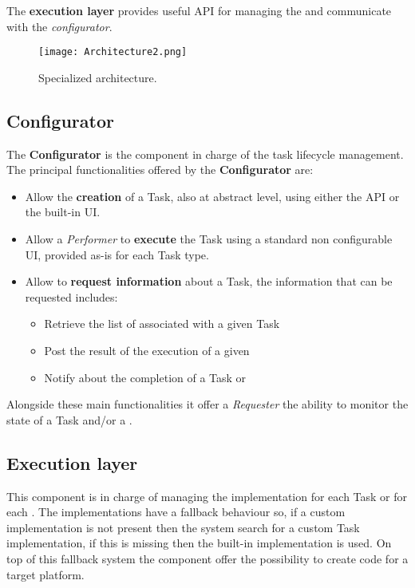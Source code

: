 The \textbf{execution layer} provides useful API for managing the \utask{} and
communicate with the \emph{configurator}.

\begin{figure}[tb]
	\centering
	\texttt{[image: Architecture2.png]}
	\caption{Specialized architecture.}
	\label{fig:architecture2}
\end{figure}





\subsection{Configurator}
The \textbf{Configurator} is the component in charge of the task lifecycle
management. The principal functionalities offered by the \textbf{Configurator}
are:
\begin{itemize}
	\item Allow the \textbf{creation} of a Task, also at abstract level, using
	either the API or the built-in UI.

	\item Allow a \emph{Performer} to \textbf{execute} the Task using a standard
	non configurable UI, provided as-is for each Task type.

	\item Allow to \textbf{request information} about a Task, the information
	that can be requested includes:
	\begin{itemize}
		\item Retrieve the list of \utask{} associated with a given Task

		\item Post the result of the execution of a given \utask{}

		\item Notify about the completion of a Task or \utask{}
	\end{itemize}
\end{itemize}

Alongside these main functionalities it offer a \emph{Requester} the ability to
monitor the state of a Task and/or a \utask{}.




\subsection{Execution layer}
This component is in charge of managing the \utask{} implementation for each Task
or for each \utask{}. The implementations have a fallback behaviour so, if a
custom \utask{} implementation is not present then the system search for a
custom Task implementation, if this is missing then the built-in implementation
is used. On top of this fallback system the component offer the possibility to
create code for a target platform.

